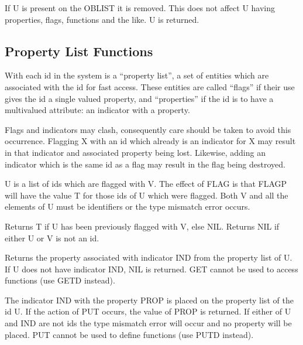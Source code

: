 {If U is present on the OBLIST it is removed. This does not affect U
having properties, flags, functions and the like. U is returned.}


\subsection{Property List Functions}
\label{plist}
With each id in the system is a ``property list'', a set of entities
which are associated with the id for fast access. These entities are
called ``flags'' if their use gives the id a single valued
property, and ``properties'' if the id is to have a multivalued
attribute: an indicator with a property.

Flags and indicators may clash, consequently care should be taken to
avoid this occurrence. Flagging X with an id which already is an
indicator for X may result in that indicator and associated property
being lost. Likewise, adding an indicator which is the same id as a
flag may result in the flag being destroyed.



{U is a list of ids which are flagged with V. The effect of FLAG is
that FLAGP will have the value T for those ids of U which were
flagged. Both V and all the elements of U must be identifiers or the
type mismatch error occurs.}


{Returns T if U has been previously flagged with V, else NIL. Returns
NIL if either U or V is not an id.}


{Returns the property associated with indicator IND from the property
list of U. If U does not have indicator IND, NIL is returned. GET
cannot be used to access functions (use GETD instead).
}


{The indicator IND with the property PROP is placed on the property
list of the id U. If the action of PUT occurs, the value of PROP is
returned. If either of U and IND are not ids the type mismatch error
will occur and no property will be placed. PUT cannot be used to
define functions (use PUTD instead).
}


